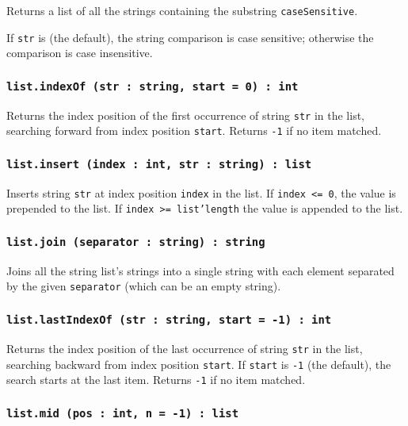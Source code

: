 Returns a list of all the strings containing the substring \texttt{caseSensitive}.

If \texttt{str} is \true{} (the default), the string comparison is case sensitive; otherwise the comparison is case insensitive.

\subsubsection{\texttt{list.indexOf (str : string, start = 0) : int}}

Returns the index position of the first occurrence of string \texttt{str} in the list, searching forward from index position \texttt{start}. Returns \texttt{-1} if no item matched.

\subsubsection{\texttt{list.insert (index : int, str : string) : list}}

Inserts string \texttt{str} at index position \texttt{index} in the list. If \texttt{index <= 0}, the value is prepended to the list. If \texttt{index >= list'length} the value is appended to the list.

\subsubsection{\texttt{list.join (separator : string) : string}}

Joins all the string list's strings into a single string with each element separated by the given \texttt{separator} (which can be an empty string).

\subsubsection{\texttt{list.lastIndexOf (str : string, start = -1) : int}}

Returns the index position of the last occurrence of string \texttt{str} in the list, searching backward from index position \texttt{start}. If \texttt{start} is \texttt{-1} (the default), the search starts at the last item. Returns \texttt{-1} if no item matched.

\subsubsection{\texttt{list.mid (pos : int, n = -1) : list}}

